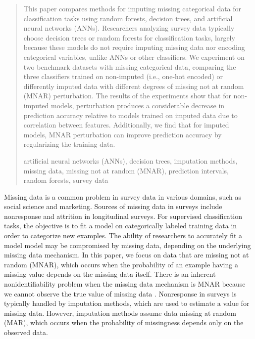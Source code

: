 \documentclass[10pt]{book}
\theoremstyle{definition}
\begin{document}
\begin{quotation}
This paper compares methods for imputing missing categorical data for classification tasks using random forests, decision trees, and artificial neural networks (ANNs). Researchers analyzing survey data typically choose decision trees or random forests for classification tasks, largely because these models do not require imputing missing data nor encoding categorical variables, unlike ANNs or other classifiers. We experiment on two benchmark datasets with missing categorical data, comparing the three classifiers trained on non-imputed (i.e., one-hot encoded) or differently imputed data with different degrees of missing not at random (MNAR) perturbation. The results of the experiments show that for non-imputed models, perturbation produces a considerable decrease in prediction accuracy relative to models trained on imputed data due to correlation between features. Additionally, we find that for imputed models, MNAR perturbation can improve prediction accuracy by regularizing the training data. \par

\vspace{9pt}
artificial neural networks (ANNs), decision trees,  imputation methods, missing data, missing not at random (MNAR), prediction intervals, random forests, survey data
\par
\end{quotation}\par



\def\thefigure{\arabic{figure}}
\def\thetable{\arabic{table}}

\fontsize{12}{14pt plus.8pt minus .6pt}\selectfont

\newpage %

\setcounter{chapter}{1}
\setcounter{equation}{0} %

Missing data is a common problem in survey data in various domains, such as social science and marketing. Sources of missing data in surveys include nonresponse and attrition in longitudinal surveys. For supervised classification tasks, the objective is to fit a model on categorically labeled training data in order to categorize new examples. The ability of researchers to accurately fit a model model may be compromised by missing data, depending on the underlying missing data mechanism. In this paper, we focus on data that are missing not at random (MNAR), which occurs when the probability of an example having a missing value depends on the missing data itself. There is an inherent nonidentifiability problem when the missing data mechanism is MNAR because we cannot observe the true value of missing data \citep[Chap.~6]{tsiatis2007}. Nonresponse in surveys is typically handled by imputation methods, which are used to estimate a value for missing data. However, imputation methods assume data missing at random (MAR), which occurs when the probability of missingness depends only on the observed data. 
\end{document}
